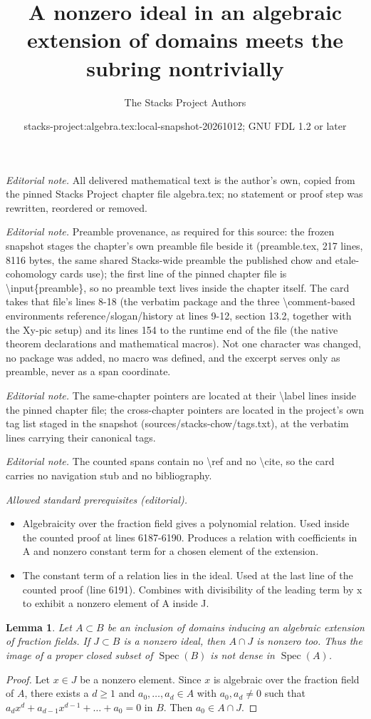 \documentclass[10pt,a4paper]{amsart}
\title{A nonzero ideal in an algebraic extension of domains meets the subring nontrivially}
\author{The Stacks Project Authors}
\date{stacks-project:algebra.tex:local-snapshot-20261012; GNU FDL 1.2 or later}
\theoremstyle{plain}
\newtheorem{lemma}[subsection]{Lemma}
\theoremstyle{definition}
\theoremstyle{remark}
\numberwithin{equation}{subsection}
\def\Spec{\mathop{\mathrm{Spec}}}
\begin{document}
\maketitle
\noindent\textit{Editorial note.} All delivered mathematical text is the author's own, copied from the pinned Stacks Project chapter file algebra.tex; no statement or proof step was rewritten, reordered or removed.\par\medskip
\noindent\textit{Editorial note.} Preamble provenance, as required for this source: the frozen snapshot stages the chapter's own preamble file beside it (preamble.tex, 217 lines, 8116 bytes, the same shared Stacks-wide preamble the published chow and etale-cohomology cards use); the first line of the pinned chapter file is \textbackslash{}input\{preamble\}, so no preamble text lives inside the chapter itself. The card takes that file's lines 8-18 (the verbatim package and the three \textbackslash{}comment-based environments reference/slogan/history at lines 9-12, section 13.2, together with the Xy-pic setup) and its lines 154 to the runtime end of the file (the native theorem declarations and mathematical macros). Not one character was changed, no package was added, no macro was defined, and the excerpt serves only as preamble, never as a span coordinate.\par\medskip
\noindent\textit{Editorial note.} The same-chapter pointers are located at their \textbackslash{}label lines inside the pinned chapter file; the cross-chapter pointers are located in the project's own tag list staged in the snapshot (sources/stacks-chow/tags.txt), at the verbatim lines carrying their canonical tags.\par\medskip
\noindent\textit{Editorial note.} The counted spans contain no \textbackslash{}ref and no \textbackslash{}cite, so the card carries no navigation stub and no bibliography.\par\medskip
\noindent\textit{Allowed standard prerequisites (editorial).}\begin{itemize}
\item Algebraicity over the fraction field gives a polynomial relation. Used inside the counted proof at lines 6187-6190. Produces a relation with coefficients in A and nonzero constant term for a chosen element of the extension.
\item The constant term of a relation lies in the ideal. Used at the last line of the counted proof (line 6191). Combines with divisibility of the leading term by x to exhibit a nonzero element of A inside J.
\end{itemize}\medskip
\begin{lemma}
\label{lemma-intersection-not-zero}
Let $A \subset B$ be an inclusion of domains inducing an algebraic extension
of fraction fields. If $J \subset B$ is a nonzero ideal, then $A \cap J$
is nonzero too. Thus the image of a proper closed subset of $\Spec(B)$
is not dense in $\Spec(A)$.
\end{lemma}

\begin{proof}
Let $x \in J$ be a nonzero element. Since $x$ is algebraic over the fraction
field of $A$, there exists a $d \geq 1$ and $a_0, \ldots, a_d \in A$
with $a_0, a_d \not = 0$ such that
$a_d x^d + a_{d - 1} x^{d - 1} + \ldots + a_0 = 0$ in $B$.
Then $a_0 \in A \cap J$.
\end{proof}
\end{document}

